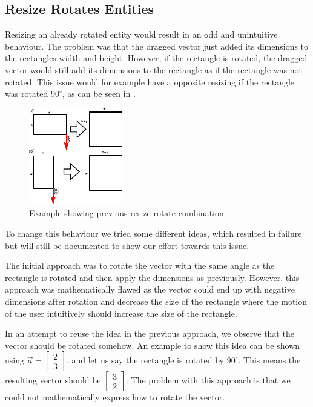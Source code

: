 \subsection{Resize Rotates Entities}
Resizing an already rotated entity would result in an odd and unintuitive behaviour.
The problem was that the dragged vector just added its dimensions to the rectangles width and height.
However, if the rectangle is rotated, the dragged vector would still add its dimensions to the rectangle as if the rectangle was not rotated.
This issue would for example have a opposite resizing if the rectangle was rotated $90^\circ$, as can be seen in .
\begin{figure}
	\centering
	\includegraphics[scale=1]{media/sprint3/How-Rotate+Resize-Worked}
	\caption{Example showing previous resize rotate combination}
	\label{fig:resizeRotate}
\end{figure}
To change this behaviour we tried some different ideas, which resulted in failure but will still be documented to show our effort towards this issue. 

The initial approach was to rotate the vector with the same angle as the rectangle is rotated and then apply the dimensions as previously.
However, this approach was mathematically flawed as the vector could end up with negative dimensions after rotation and decrease the size of the rectangle where the motion of the user intuitively should increase the size of the rectangle.

In an attempt to reuse the idea in the previous approach, we observe that the vector should be rotated somehow.
An example to show this idea can be shown using $\vec{a} =
\begin{bmatrix}
2 \\ 3
\end{bmatrix}$, and let us say the rectangle is rotated by $90^\circ$.
This means the resulting vector should be 
$\begin{bmatrix}
3 \\ 2
\end{bmatrix}$.
The problem with this approach is that we could not mathematically express how to rotate the vector.


